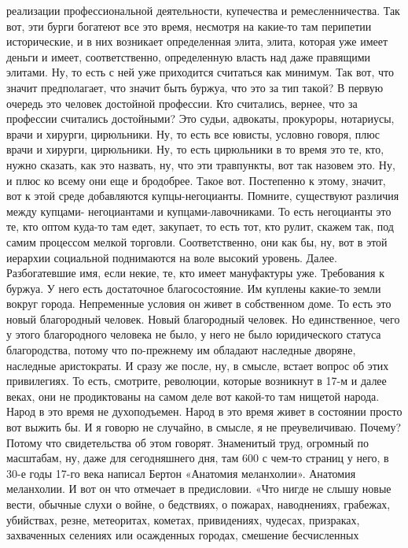 реализации профессиональной деятельности, купечества и ремесленничества. Так
вот, эти бурги богатеют все это время, несмотря на какие-то там перипетии
исторические, и в них возникает определенная элита, элита, которая уже имеет
деньги и имеет, соответственно, определенную власть над даже правящими элитами.
Ну, то есть с ней уже приходится считаться как минимум. Так вот, что значит
предполагает, что значит быть буржуа, что это за тип такой? В первую очередь это
человек достойной профессии. Кто считались, вернее, что за профессии считались
достойными? Это судьи, адвокаты, прокуроры, нотариусы, врачи и хирурги,
цирюльники. Ну, то есть все ювисты, условно говоря, плюс врачи и хирурги,
цирюльники. Ну, то есть цирюльники в то время это те, кто, нужно сказать, как
это назвать, ну, что эти травпункты, вот так назовем это. Ну, и плюс ко всему
они еще и бродобрее. Такое вот. Постепенно к этому, значит, вот к этой среде
добавляются купцы-негоцианты. Помните, существуют различия между купцами-
негоциантами и купцами-лавочниками. То есть негоцианты это те, кто оптом куда-то
там едет, закупает, то есть тот, кто рулит, скажем так, под самим процессом
мелкой торговли. Соответственно, они как бы, ну, вот в этой иерархии социальной
поднимаются на воле высокий уровень. Далее. Разбогатевшие имя, если некие, те,
кто имеет мануфактуры уже. Требования к буржуа. У него есть достаточное
благосостояние. Им куплены какие-то земли вокруг города. Непременные условия он
живет в собственном доме. То есть это новый благородный человек. Новый
благородный человек. Но единственное, чего у этого благородного человека не
было, у него не было юридического статуса благородства, потому что по-прежнему
им обладают наследные дворяне, наследные аристократы. И сразу же после, ну, в
смысле, встает вопрос об этих привилегиях. То есть, смотрите, революции, которые
возникнут в 17-м и далее веках, они не продиктованы на самом деле вот какой-то
там нищетой народа. Народ в это время не духоподъемен. Народ в это время живет в
состоянии просто вот выжить бы. И я говорю не случайно, в смысле, я не
преувеличиваю. Почему? Потому что свидетельства об этом говорят. Знаменитый
труд, огромный по масштабам, ну, даже для сегодняшнего дня, там 600 с чем-то
страниц у него, в 30-е годы 17-го века написал Бертон «Анатомия меланхолии».
Анатомия меланхолии. И вот он что отмечает в предисловии. «Что нигде не слышу
новые вести, обычные слухи о войне, о бедствиях, о пожарах, наводнениях,
грабежах, убийствах, резне, метеоритах, кометах, привидениях, чудесах,
призраках, захваченных селениях или осажденных городах, смешение бесчисленных
